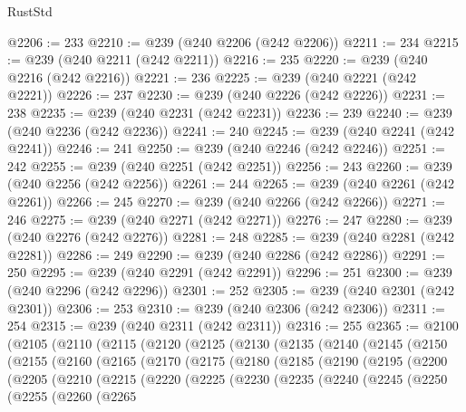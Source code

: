 \begin{lexlean}{RustStd}
\begin{coremodule}
{\begin{coremodule}
{{{{{{{{{{{{{{{{{{{{{{{{{{{{{{{{{{{{{{{{{{{{{{{{{{{{{{{{{{{{@2206 := 233
@2210 := @239 (@240 @2206 (@242 @2206))
@2211 := 234
@2215 := @239 (@240 @2211 (@242 @2211))
@2216 := 235
@2220 := @239 (@240 @2216 (@242 @2216))
@2221 := 236
@2225 := @239 (@240 @2221 (@242 @2221))
@2226 := 237
@2230 := @239 (@240 @2226 (@242 @2226))
@2231 := 238
@2235 := @239 (@240 @2231 (@242 @2231))
@2236 := 239
@2240 := @239 (@240 @2236 (@242 @2236))
@2241 := 240
@2245 := @239 (@240 @2241 (@242 @2241))
@2246 := 241
@2250 := @239 (@240 @2246 (@242 @2246))
@2251 := 242
@2255 := @239 (@240 @2251 (@242 @2251))
@2256 := 243
@2260 := @239 (@240 @2256 (@242 @2256))
@2261 := 244
@2265 := @239 (@240 @2261 (@242 @2261))
@2266 := 245
@2270 := @239 (@240 @2266 (@242 @2266))
@2271 := 246
@2275 := @239 (@240 @2271 (@242 @2271))
@2276 := 247
@2280 := @239 (@240 @2276 (@242 @2276))
@2281 := 248
@2285 := @239 (@240 @2281 (@242 @2281))
@2286 := 249
@2290 := @239 (@240 @2286 (@242 @2286))
@2291 := 250
@2295 := @239 (@240 @2291 (@242 @2291))
@2296 := 251
@2300 := @239 (@240 @2296 (@242 @2296))
@2301 := 252
@2305 := @239 (@240 @2301 (@242 @2301))
@2306 := 253
@2310 := @239 (@240 @2306 (@242 @2306))
@2311 := 254
@2315 := @239 (@240 @2311 (@242 @2311))
@2316 := 255
@2365 := @2100
    (@2105
      (@2110
        (@2115
          (@2120
            (@2125
              (@2130
                (@2135
                  (@2140
                    (@2145
                      (@2150
                        (@2155
                          (@2160
                            (@2165
                              (@2170
                                (@2175
                                  (@2180
                                    (@2185
                                      (@2190
                                        (@2195
                                          (@2200
                                            (@2205
                                              (@2210
                                                (@2215
                                                  (@2220
                                                    (@2225
                                                      (@2230
                                                        (@2235
                                                          (@2240
                                                            (@2245
                                                              (@2250
                                                                (@2255
                                                                  (@2260
                                                                    (@2265
}}}}}}}}}}}}}}}}}}}}}}}}}}}}}}}}}}}}}}}}}}}}}}}}}}}}}}}}}}}}
\end{coremodule}}
\end{coremodule}
\end{lexlean}
